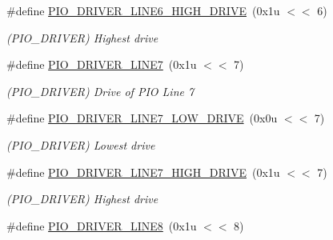 \begin{DoxyCompactItemize}
\mbox{\label{group__SAMS70__PIO_ga76cd5c93eebc01ec7840130d1ff47773}} 
\#define \mbox{\hyperlink{group__SAMS70__PIO_ga76cd5c93eebc01ec7840130d1ff47773}{P\+I\+O\+\_\+\+D\+R\+I\+V\+E\+R\+\_\+\+L\+I\+N\+E6\+\_\+\+H\+I\+G\+H\+\_\+\+D\+R\+I\+VE}}~(0x1u $<$$<$ 6)
\begin{DoxyCompactList}\small\item\em (P\+I\+O\+\_\+\+D\+R\+I\+V\+ER) Highest drive \end{DoxyCompactList}\item 
\mbox{\label{group__SAMS70__PIO_ga8b92274e289f754c152d5fff93f1921f}} 
\#define \mbox{\hyperlink{group__SAMS70__PIO_ga8b92274e289f754c152d5fff93f1921f}{P\+I\+O\+\_\+\+D\+R\+I\+V\+E\+R\+\_\+\+L\+I\+N\+E7}}~(0x1u $<$$<$ 7)
\begin{DoxyCompactList}\small\item\em (P\+I\+O\+\_\+\+D\+R\+I\+V\+ER) Drive of P\+IO Line 7 \end{DoxyCompactList}\item 
\mbox{\label{group__SAMS70__PIO_ga093c02ecb8fa9199590b087ce7d2eabe}} 
\#define \mbox{\hyperlink{group__SAMS70__PIO_ga093c02ecb8fa9199590b087ce7d2eabe}{P\+I\+O\+\_\+\+D\+R\+I\+V\+E\+R\+\_\+\+L\+I\+N\+E7\+\_\+\+L\+O\+W\+\_\+\+D\+R\+I\+VE}}~(0x0u $<$$<$ 7)
\begin{DoxyCompactList}\small\item\em (P\+I\+O\+\_\+\+D\+R\+I\+V\+ER) Lowest drive \end{DoxyCompactList}\item 
\mbox{\label{group__SAMS70__PIO_ga90025136b0f5428c0054d88c20fe2830}} 
\#define \mbox{\hyperlink{group__SAMS70__PIO_ga90025136b0f5428c0054d88c20fe2830}{P\+I\+O\+\_\+\+D\+R\+I\+V\+E\+R\+\_\+\+L\+I\+N\+E7\+\_\+\+H\+I\+G\+H\+\_\+\+D\+R\+I\+VE}}~(0x1u $<$$<$ 7)
\begin{DoxyCompactList}\small\item\em (P\+I\+O\+\_\+\+D\+R\+I\+V\+ER) Highest drive \end{DoxyCompactList}\item 
\mbox{\label{group__SAMS70__PIO_gaa49e8999e47422be5b7195cc5e0c7834}} 
\#define \mbox{\hyperlink{group__SAMS70__PIO_gaa49e8999e47422be5b7195cc5e0c7834}{P\+I\+O\+\_\+\+D\+R\+I\+V\+E\+R\+\_\+\+L\+I\+N\+E8}}~(0x1u $<$$<$ 8)
$$
\end{DoxyCompactItemize}
